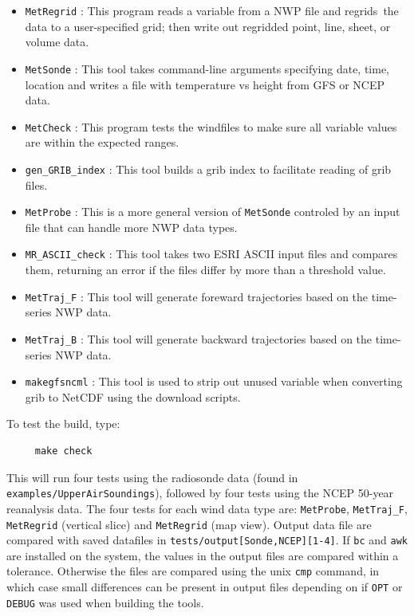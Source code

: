 \documentclass[11pt]{article}   %
\begin{document}
\begin{itemize}
\item \texttt{MetRegrid} : This program reads a variable from a NWP file and regrids\
the data to a user-specified grid; then write out regridded point, line, sheet, or volume data.
\item \texttt{MetSonde} : This tool takes command-line arguments specifying date, time, location
and writes a file with temperature vs height from GFS or NCEP data.
\item \texttt{MetCheck} : This program tests the windfiles to make sure all variable values
are within the expected ranges.
\item \texttt{gen\_GRIB\_index} : This tool builds a grib index to facilitate reading of grib
files.
\item \texttt{MetProbe} : This is a more general version of \texttt{MetSonde} controled by
an input file that can handle more NWP data types.
\item \texttt{MR\_ASCII\_check} : This tool takes two ESRI ASCII input files and compares them,
returning an error if the files differ by more than a threshold value.
\item \texttt{MetTraj\_F} : This tool will generate foreward trajectories based on the
time-series NWP data.
\item \texttt{MetTraj\_B} : This tool will generate backward trajectories based on the
time-series NWP data.
\item \texttt{makegfsncml} :  This tool is used to strip out unused variable when converting
grib to NetCDF using the download scripts.
\end{itemize}

To test the build, type:
\begin{verbatim}
     make check
\end{verbatim}
This will run four tests using the radiosonde data (found in \texttt{examples/UpperAirSoundings}),
followed by four tests using the NCEP 50-year reanalysis data.  The four tests for
each wind data type are: \texttt{MetProbe}, \texttt{MetTraj\_F}, \texttt{MetRegrid} (vertical slice)
and  \texttt{MetRegrid} (map view).
Output data file are compared with saved datafiles in \texttt{tests/output[Sonde,NCEP][1-4]}.
If \texttt{bc} and \texttt{awk} are installed on the system, the values in the output files are
compared within a tolerance.  Otherwise the files are compared
using the unix \texttt{cmp} command, in which case small differences
can be present in output files depending on if \texttt{OPT} or \texttt{DEBUG} was used
when building the tools.
\end{document}
